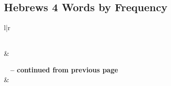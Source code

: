 

\subsection{Hebrews 4 Words by Frequency}


\normalsize
 
\begin{center}
\begin{longtable}{l|r}
\caption[Hebrews 4 Words by Frequency]{Hebrews 4 Words by Frequency}\label{table:WordsbyFrequency for Hebrews 4} \\
\hline {} &  \\ \hline 
\endfirsthead
 
{{\bfseries \tablename\ \thetable{} -- continued from previous page}} \\  
\hline {} &  \\ \hline 
\endhead
 

\end{longtable}
\end{center}
